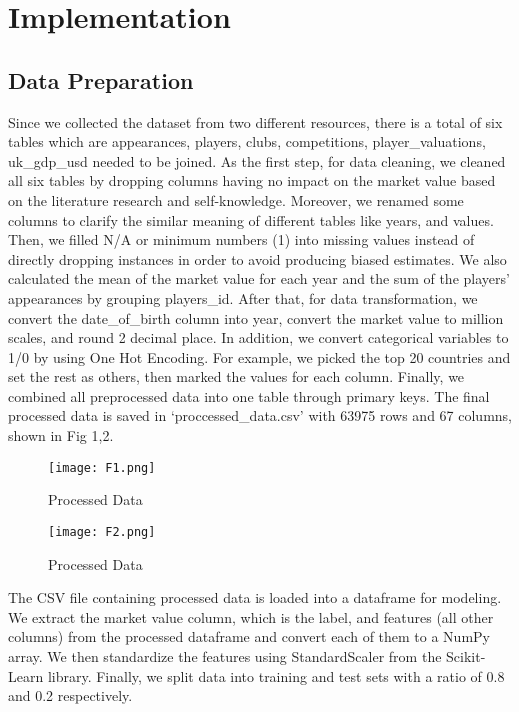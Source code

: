 \documentclass[conference]{IEEEtran}
\begin{document}
\section{Implementation}
\subsection{Data Preparation}
Since we collected the dataset from two different resources, there is a total of six tables which are appearances, players, clubs, competitions, player\_valuations, uk\_gdp\_usd needed to be joined. As the first step, for data cleaning, we cleaned all six tables by dropping columns having no impact on the market value based on the literature research and self-knowledge. Moreover, we renamed some columns to clarify the similar meaning of different tables like years, and values. Then, we filled N/A or minimum numbers (1) into missing values instead of directly dropping instances in order to avoid producing biased estimates. We also calculated the mean of the market value for each year and the sum of the players' appearances by grouping players\_id. After that, for data transformation, we convert the date\_of\_birth column into year, convert the market value to million scales, and round 2 decimal place. In addition, we convert categorical variables to 1/0 by using One Hot Encoding. For example, we picked the top 20 countries and set the rest as others, then marked the values for each column. Finally, we combined all preprocessed data into one table through primary keys. The final processed data is saved in ‘proccessed\_data.csv’ with 63975 rows and 67 columns, shown in Fig 1,2.\par

\begin{figure}[ht]
\begin{center}
\centerline{\texttt{[image: F1.png]}}
\caption{Processed Data}
\label{bayespic}
\end{center}
\end{figure}
\begin{figure}[ht]
\begin{center}
\centerline{\texttt{[image: F2.png]}}
\caption{Processed Data}
\label{bayespic}
\end{center}
\end{figure}
The CSV file containing processed data is loaded into a dataframe for modeling. We extract the market value column, which is the label, and features (all other columns) from the processed dataframe and convert each of them to a NumPy array. We then standardize the features using StandardScaler from the Scikit-Learn library. Finally, we split data into training and test sets with a ratio of 0.8 and 0.2 respectively.
\end{document}
